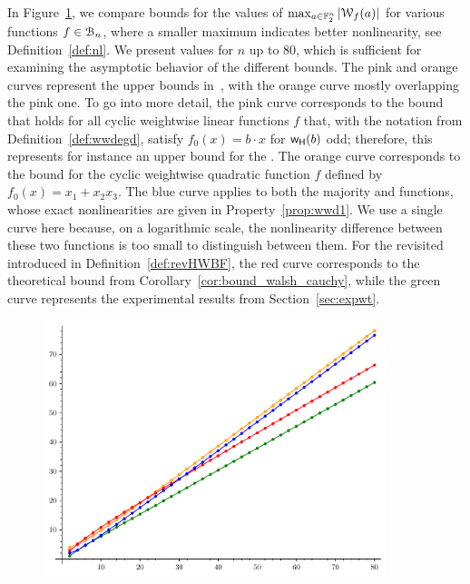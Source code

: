 \documentclass{llncs}
\begin{document}
In Figure~\ref{fig:walsh_bound_comparison}, we compare bounds for the values of $\max_{a \in \mathbb{F}_2^n} |\mathcal W_{f}(a)|$ for various functions $f\in\mathcal{B}_n$, where a smaller maximum indicates better nonlinearity, see Definition~\ref{def:nl}.
We present values for $n$ up to $80$, which is sufficient for examining the asymptotic behavior of the different bounds.
The pink and orange curves represent the upper bounds  in~\cite{DAM:MeaOza24}, with the orange curve mostly overlapping the pink one. To go into more detail, the pink curve corresponds to the bound that holds for all cyclic weightwise linear functions $f$ that, with the notation from Definition~\ref{def:wwdegd}, satisfy $ f_0(x) = b \cdot x $ for $\mathsf{w_H}(b)$ odd; therefore, this represents for instance an upper bound for the \hwbf{}. The orange curve corresponds to the bound for the cyclic weightwise quadratic function $f$ defined by $f_0(x) = x_1 + x_2 x_3$.
The blue curve applies to both the majority and \hwbf{} functions, whose exact nonlinearities are given in Property~\ref{prop:wwd1}. We use a single curve here because, on a logarithmic scale, the nonlinearity difference between these two functions is too small to distinguish between them.
For the revisited \hwbf{} introduced in Definition~\ref{def:revHWBF}, the red curve corresponds to the theoretical bound from Corollary~\ref{cor:bound_walsh_cauchy}, while the green curve represents the experimental results from Section~\ref{sec:expwt}.

\begin{figure}[ht]
	\centering
	\includegraphics[width=10cm]{comparison_walsh_bound.pdf}
	\label{fig:walsh_bound_comparison}
\end{figure}
\end{document}
